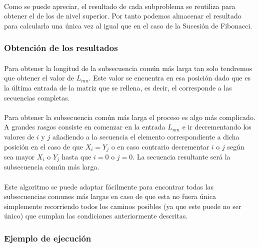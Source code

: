 \documentclass{article}
\begin{document}
			\paragraph{}
			Como se puede apreciar, el resultado  de cada subproblema se reutiliza para obtener el de los de nivel superior. Por tanto podemos almacenar el resultado para calcularlo una única vez al igual que en el caso de la Sucesión de Fibonacci.

		\subsubsection{Obtención de los resultados}
		
			\paragraph{}
			Para obtener la longitud de la subsecuencia común más larga tan solo tendremos que obtener el valor de $L_{mn}$. Este valor se encuentra en esa posición dado que es la última entrada de la matriz que se rellena, es decir, el corresponde a las secuencias completas.

			\paragraph{}
			Para obtener la subsecuencia común más larga el proceso es algo más complicado. A grandes rasgos consiste en comenzar en la entrada $L_{mn}$ e ir decrementando los valores de $i$ y $j$ añadiendo a la secuencia el elemento correspondiente a dicha posición en el caso de que $ X_{i} = Y_{j}$ o en caso contrario decrementar $i$ o $j$ según sea mayor $X_{i}$ o  $Y_{j}$ hasta que $i = 0$ o $j = 0$. La secuencia resultante será la subsecuencia común más larga.

			\paragraph{}
			Este algoritmo se puede adaptar fácilmente para encontrar todas las subsecuencias comunes más largas en caso de que esta no fuera única simplemente recorriendo todos los caminos posibles (ya que este puede no ser único) que cumplan las condiciones anteriormente descritas.

		\subsubsection{Ejemplo de ejecución}
\end{document}
